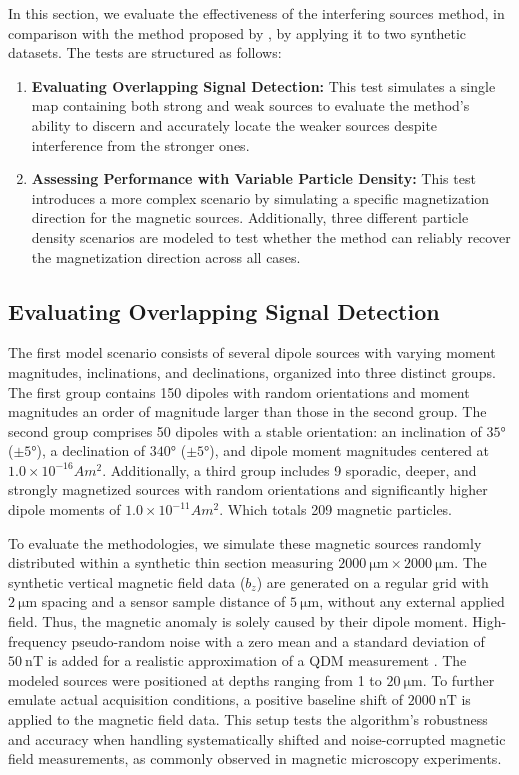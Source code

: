In this section, we evaluate the effectiveness of the interfering sources method, in comparison with the method proposed by \citet{Souza-Junior2024}, by applying it to two synthetic datasets. The tests are structured as follows:  


\begin{enumerate}
    \item \textbf{Evaluating Overlapping Signal Detection:}
        This test simulates a single map containing both strong and weak sources to evaluate the method's ability to discern and accurately locate the weaker sources despite interference from the stronger ones.
    \item \textbf{Assessing Performance with Variable Particle Density:}
        This test introduces a more complex scenario by simulating a specific magnetization direction for the magnetic sources. Additionally, three different particle density scenarios are modeled to test whether the method can reliably recover the magnetization direction across all cases.
\end{enumerate}

\subsection{Evaluating Overlapping Signal Detection}

The first model scenario consists of several dipole sources with varying moment magnitudes, inclinations, and declinations, organized into three distinct groups. The first group contains 150 dipoles with random orientations and moment magnitudes an order of magnitude larger than those in the second group. The second group comprises 50 dipoles with a stable orientation: an inclination of \(\ang{35}\) (\(\pm \ang{5}\)), a declination of \(\ang{340}\) (\(\pm \ang{5}\)), and dipole moment magnitudes centered at \(1.0 \times 10^{-16} Am^2\). Additionally, a third group includes 9 sporadic, deeper, and strongly magnetized sources with random orientations and significantly higher dipole moments of \(1.0 \times 10^{-11} Am^2\). Which totals 209 magnetic particles.

To evaluate the methodologies, we simulate these magnetic sources randomly distributed within a synthetic thin section measuring \(\qty{2000}{\micro\meter} \times \qty{2000}{\micro\meter}\). The synthetic vertical magnetic field data (\(b_z\)) are generated on a regular grid with \(\qty{2}{\micro\meter}\) spacing and a sensor sample distance of \(\qty{5}{\micro\meter}\), without any external applied field. Thus, the magnetic anomaly is solely caused by their dipole moment. High-frequency pseudo-random noise with a zero mean and a standard deviation of \(\qty{50}{\nano\tesla}\) is added for a realistic approximation of a QDM measurement \citep{Glenn2017}. The modeled sources were positioned at depths ranging from 1 to \(\qty{20}{\micro\meter}\). To further emulate actual acquisition conditions, a positive baseline shift of \(\qty{2000}{\nano\tesla}\) is applied to the magnetic field data. This setup tests the algorithm's robustness and accuracy when handling systematically shifted and noise-corrupted magnetic field measurements, as commonly observed in magnetic microscopy experiments.

